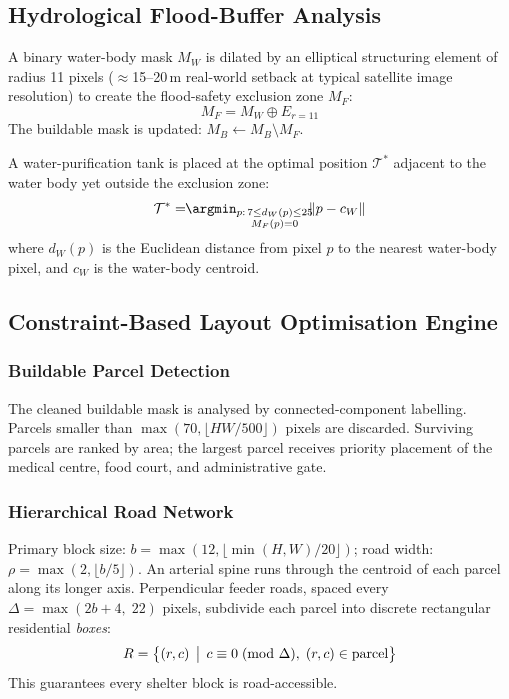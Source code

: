 \documentclass[twocolumn]{article}
\begin{document}
\subsection{Hydrological Flood-Buffer Analysis}

A binary water-body mask $M_W$ is dilated by an elliptical structuring element of radius 11 pixels
($\approx$15--20\,m real-world setback at typical satellite image resolution) to create the
flood-safety exclusion zone $M_F$:
\begin{equation}
  M_F = M_W \oplus E_{r=11}
  \label{eq:flood}
\end{equation}
The buildable mask is updated: $M_B \leftarrow M_B \setminus M_F$.

A water-purification tank is placed at the optimal position $\mathcal{T}^*$ adjacent to the water
body yet outside the exclusion zone:
\begin{equation}
  \mathcal{T}^* = \!\!\argmin_{\substack{p:\,7 \le d_W(p) \le 25 \\ M_F(p)=0}} \!\! \lVert p - c_W \rVert
  \label{eq:tank}
\end{equation}
where $d_W(p)$ is the Euclidean distance from pixel $p$ to the nearest water-body pixel, and $c_W$
is the water-body centroid.

\subsection{Constraint-Based Layout Optimisation Engine}

\subsubsection{Buildable Parcel Detection}

The cleaned buildable mask is analysed by connected-component labelling.
Parcels smaller than $\max(70,\lfloor HW/500 \rfloor)$ pixels are discarded.
Surviving parcels are ranked by area; the largest parcel receives priority placement of the medical
centre, food court, and administrative gate.

\subsubsection{Hierarchical Road Network}

Primary block size: $b = \max(12, \lfloor\min(H,W)/20\rfloor)$;
road width: $\rho = \max(2, \lfloor b/5 \rfloor)$.
An arterial spine runs through the centroid of each parcel along its longer axis.
Perpendicular feeder roads, spaced every
$\Delta = \max(2b+4,\;22)$ pixels, subdivide each parcel into
discrete rectangular residential \emph{boxes}:
\begin{equation}
  R = \bigl\{(r,c)\,\bigm|\,
    c \equiv 0\!\pmod{\Delta},\;(r,c)\in\mathrm{parcel}\bigr\}
  \label{eq:road}
\end{equation}
This guarantees every shelter block is road-accessible.
\end{document}
